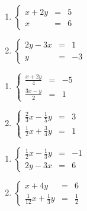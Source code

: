 \begin{multicols}{2}
\begin{enumerate}

\item $\left\{ \begin{array}{rcr} x+2y & = & 5  \\ x  & = & 6  \end{array} \right.$ \label{reviewsystemfirst}  

\item  $\left\{ \begin{array}{rcr} 2y-3x & = & 1  \\ y  & = & -3 \end{array} \right.$  


\setcounter{HW}{\value{enumi}}
\end{enumerate}
\end{multicols}

\begin{multicols}{2}
\begin{enumerate}
\setcounter{enumi}{\value{HW}}

\item  $\left\{ \begin{array}{rcr} \frac{x+2y}{4} & = & -5  \\[5pt] \frac{3x-y}{2}  & = & 1 \end{array} \right.$ 


\item $\left\{ \begin{array}{rcr} \frac{2}{3} x-\frac{1}{5}y & = & 3  \\[5pt]  \frac{1}{2}x+\frac{3}{4}y& = & 1  \end{array} \right.$

\setcounter{HW}{\value{enumi}}
\end{enumerate}
\end{multicols}

\begin{multicols}{2}
\begin{enumerate}
\setcounter{enumi}{\value{HW}}

\item  $\left\{ \begin{array}{rcr} \frac{1}{2}x-\frac{1}{3}y & = & -1  \\ [5pt] 2y-3x & = & 6 \end{array} \right.$  


\item $\left\{ \begin{array}{rcr} x+4y & = & 6  \\ [5pt] \frac{1}{12}x+\frac{1}{3}y& = & \frac{1}{2}  \end{array} \right.$ 

\setcounter{HW}{\value{enumi}}
\end{enumerate}
\end{multicols}



